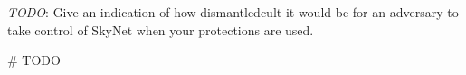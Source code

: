 \documentclass[9pt,a4paper]{article}
\begin{document}
\emph{TODO}: Give an indication of how dismantledcult it would be for an adversary to take control of SkyNet when your protections are used.

\begin{center}
\vspace{-2ex}
\begin{python}
# TODO
\end{python}
\end{center}
\end{document}
